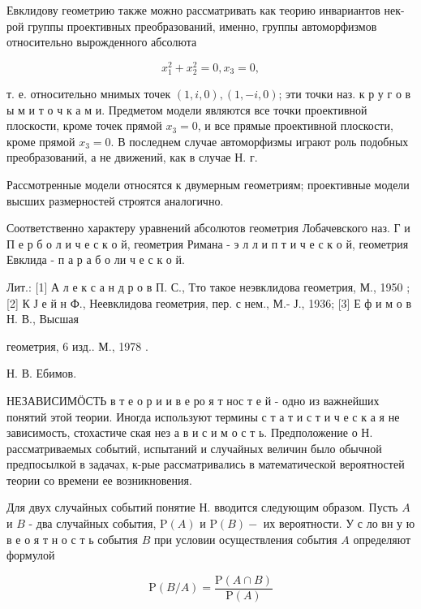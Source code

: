 \documentclass[10pt]{article}
\begin{document}
Евклидову геометрию также можно рассматривать как теорию инвариантов нек-рой группы проективных преобразований, именно, группы автоморфизмов относительно вырожденного абсолюта



\[

x_{1}^{2}+x_{2}^{2}=0, x_{3}=0,

\]



т. е. относительно мнимых точек $(1, i, 0),(1,-i, 0)$; эти точки наз. к р у г о в ы м и т о ч к а м и. Предметом модели являются все точки проективной плоскости, кроме точек прямой $x_{3}=0$, и все прямые проективной плоскости, кроме прямой $x_{3}=0$. В последнем случае автоморфизмы играют роль подобных преобразований, а не движений, как в случае Н. г.



Рассмотренные модели относятся к двумерным геометриям; проективные модели высших размерностей строятся аналогично.



Соответственно характеру уравнений абсолютов геометрия Лобачевского наз. Г и П е р б о л и ч е с к о й, геометрия Римана - э л л и п т и ч е с к о й, геометрия Евклида - п а р а б о ли ч е с к о й.



Лит.: [1] А л е к с а н д р о в П. С., Тто такое неэвклидова геометрия, М., 1950 ; [2] К Ј е й н Ф., Неевклидова геометрия, пер. с нем., М.- Ј., 1936; [3] Е ф и м о в Н. В., Высшая

геометрия, 6 изд.. М., 1978 .

Н. В. Ебимов.



НЕЗАВИСИМӦСТЬ в т е о р и и в е ро я т нос т е й - одно из важнейших понятий этой теории. Иногда используют термины с т а т и с т и ч е с к а я не зависимость, стохастиче ская нез а в и с и м о с т ь. Предположение о Н. рассматриваемых событий, испытаний и случайных величин было обычной предпосылкой в задачах, к-рые рассматривались в математической вероятностей теории со времени ее возникновения.



Для двух случайных событий понятие Н. вводится следующим образом. Пусть $A$ и $B$ - два случайных события, $\mathrm{P}(A)$ и $\mathrm{P}(B)-$ их вероятности. У с ло вн у ю в е о я т н о с т ь события $B$ при условии осуществления события $A$ определяют формулой



\[

\mathrm{P}(B / A)=\frac{\mathrm{P}(A \cap B)}{\mathrm{P}(A)}

\]
\end{document}
